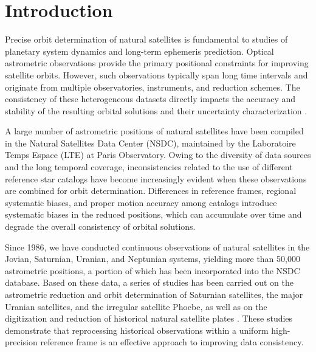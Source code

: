 \documentclass[linenumbers,amsmath,manuscript]{aastex702}
\begin{document}

\section{Introduction} \label{sec:intro}

Precise orbit determination of natural satellites is fundamental to studies of planetary system dynamics and long-term ephemeris prediction. Optical astrometric observations provide the primary positional constraints for improving satellite orbits. However, such observations typically span long time intervals and originate from multiple observatories, instruments, and reduction schemes. The consistency of these heterogeneous datasets directly impacts the accuracy and stability of the resulting orbital solutions and their uncertainty characterization \citep{Desmars2013}.

A large number of astrometric positions of natural satellites have been compiled in the Natural Satellites Data Center (NSDC), maintained by the Laboratoire Temps Espace (LTE) at Paris Observatory. Owing to the diversity of data sources and the long temporal coverage, inconsistencies related to the use of different reference star catalogs have become increasingly evident when these observations are combined for orbit determination. Differences in reference frames, regional systematic biases, and proper motion accuracy among catalogs introduce systematic biases in the reduced positions, which can accumulate over time and degrade the overall consistency of orbital solutions.

Since 1986, we have conducted continuous observations of natural satellites in the Jovian, Saturnian, Uranian, and Neptunian systems, yielding more than 50,000 astrometric positions, a portion of which has been incorporated into the NSDC database. Based on these data, a series of studies has been carried out on the astrometric reduction and orbit determination of Saturnian satellites, the major Uranian satellites, and the irregular satellite Phoebe, as well as on the digitization and reduction of historical natural satellite plates \citep{Qiao1999,Shen2002,Qiao2006Phoebe,Yan2016Plates}. These studies demonstrate that reprocessing historical observations within a uniform high-precision reference frame is an effective approach to improving data consistency.
\end{document}
